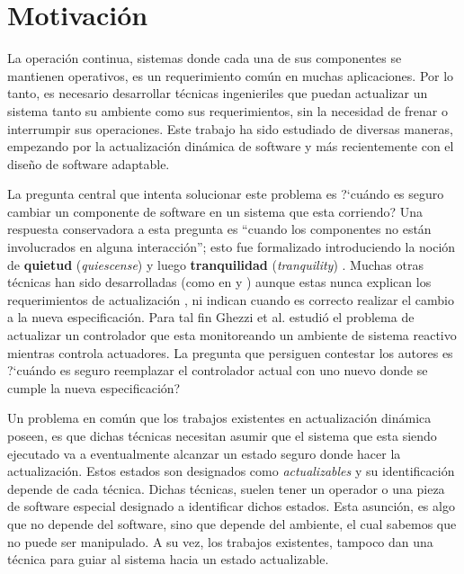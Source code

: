 \section{Motivación}

La operación continua, sistemas donde cada una de sus componentes se mantienen operativos, es un requerimiento común en
muchas aplicaciones. Por lo tanto, es necesario desarrollar técnicas ingenieriles que puedan actualizar un sistema
tanto su ambiente como sus requerimientos, sin la necesidad de frenar o interrumpir sus operaciones. Este trabajo ha
sido estudiado de diversas maneras, empezando por la actualización dinámica de software \cite{60317} y más recientemente con el diseño de software adaptable. \cite{SEAMS}

La pregunta central que intenta solucionar este problema es ?`cuándo es seguro cambiar un componente de software en un sistema
que esta corriendo? Una respuesta conservadora a esta pregunta es ``cuando los componentes no están involucrados en
alguna interacción''; esto fue formalizado introduciendo la noción de \textbf{quietud} (\emph{quiescense}) \cite{60317} y luego
\textbf{tranquilidad} (\emph{tranquility}) \cite{4359466}. Muchas otras técnicas han sido desarrolladas (como en
\cite{Anderson:2009:MPM:1656437.1656448} y \cite{485222}) aunque estas nunca explican los requerimientos de
actualización \cite{Baresi:2010:DBD:1882362.1882367}, ni indican cuando es correcto realizar el cambio a la nueva especificación.
Para tal fin Ghezzi et al. \cite{6224401,PanzicaLaManna:2013:FCC:2487336.2487349} estudió el problema de actualizar un
controlador que esta monitoreando un ambiente de sistema reactivo mientras controla actuadores. La pregunta que persiguen
contestar los autores es ?`cuándo es seguro reemplazar el controlador actual con uno nuevo donde se cumple la nueva
especificación?

Un problema en común que los trabajos existentes en actualización dinámica poseen, es que dichas técnicas necesitan
asumir que el sistema que esta siendo ejecutado va a eventualmente alcanzar un estado seguro donde hacer la
actualización. Estos estados son designados como \emph{actualizables} y su identificación depende de cada técnica.
Dichas técnicas, suelen tener un operador o una pieza de software especial designado a identificar dichos estados. Esta asunción, es algo
que no depende del software, sino que depende del ambiente, el cual sabemos que no puede ser manipulado. A su vez, los trabajos
existentes, tampoco dan una técnica para guiar al sistema hacia un estado actualizable. 

